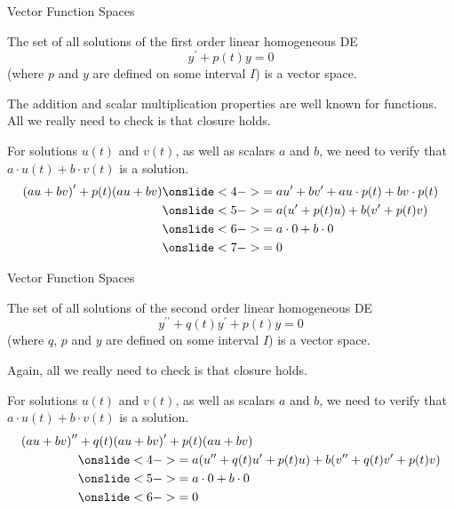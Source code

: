 \documentclass{beamer}
\begin{document}
\begin{frame}{Vector Function Spaces}
\begin{example}
The set of all solutions of the first order linear homogeneous DE
\begin{equation*}
y^\prime+p(t)y=0
\end{equation*}
(where $p$ and $y$ are defined on some interval $I$) is a vector space.

\vspace{0.25cm}
The addition and scalar multiplication properties are well known for functions. All we really need to check is that closure holds.\pause
{}

\vspace{0.25cm}
For solutions $u(t)$ and $v(t)$, as well as scalars $a$ and $b$, we need to verify that $a\cdot u(t)+b\cdot v(t)$ is a solution.
\begin{equation*}
\begin{split}
{(au+bv)}^\prime+p(t)(au+bv)&\onslide<4->{=au^\prime+bv^\prime+au\cdot p(t)+bv\cdot p(t)}\\
&\onslide<5->{=a(u^\prime+p(t)u)+b(v^\prime+p(t)v)}\\
&\onslide<6->{=a\cdot 0+b\cdot 0}\\
&\onslide<7->{=0}
\end{split}
\end{equation*}
\end{example}
\end{frame}

\begin{frame}{Vector Function Spaces}
\begin{example}
The set of all solutions of the second order linear homogeneous DE
\begin{equation*}
y^{\prime\prime}+q(t)y^\prime+p(t)y=0
\end{equation*}
(where $q$, $p$ and $y$ are defined on some interval $I$) is a vector space.

\vspace{0.25cm}
Again, all we really need to check is that closure holds.\pause
{}

\vspace{0.25cm}
For solutions $u(t)$ and $v(t)$, as well as scalars $a$ and $b$, we need to verify that $a\cdot u(t)+b\cdot v(t)$ is a solution.
\begin{equation*}
\begin{split}
{(au+bv)}^{\prime\prime}&+q(t){(au+bv)}^\prime+p(t)(au+bv)\\
&\onslide<4->{=a(u^{\prime\prime}+q(t)u^\prime+p(t)u)+b(v^{\prime\prime}+q(t)v^\prime+p(t)v)}\\
&\onslide<5->{=a\cdot 0+b\cdot 0}\\
&\onslide<6->{=0}
\end{split}
\end{equation*}
\end{example}
\end{frame}
\end{document}
